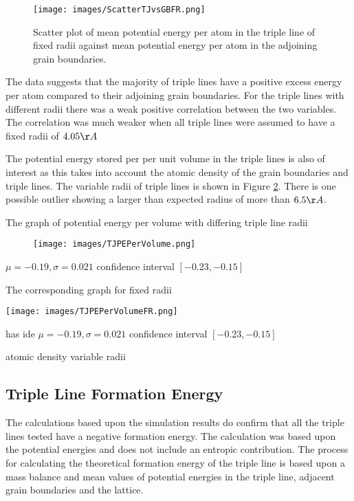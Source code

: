\documentclass[12pt,a4paper]{book}
\begin{document}
\begin{figure}
	\texttt{[image: images/ScatterTJvsGBFR.png]} 
	\label{fig:ScatterTJvsGBFR}
	\caption{Scatter plot of mean potential energy per atom in the triple line of fixed radii against mean potential energy per atom in the adjoining grain boundaries.}
\end{figure}

The data suggests that the majority of triple lines have a positive excess energy per atom compared to their adjoining grain boundaries. For the triple lines with different radii there was a weak positive correlation between the two variables. The correlation was much weaker when all triple lines were assumed to have a fixed radii of $4.05 \AA$ 

The potential energy stored per per unit volume in the triple lines is also of interest as this takes into account the atomic density of the grain boundaries and triple lines. The variable radii of triple lines is shown in Figure \ref{fig:PEPerVol}. There is one possible outlier showing a larger than expected radius of more than $6.5 \AA$. 




The graph of potential energy per volume with differing triple line radii

\begin{figure}
	\texttt{[image: images/TJPEPerVolume.png]} 
	\label{fig:PEPerVol}
\end{figure}
$\mu = -0.19, \sigma = 0.021$ confidence interval $[-0.23, -0.15]$

The corresponding graph for fixed radii

\texttt{[image: images/TJPEPerVolumeFR.png]} 

has ide
$\mu = -0.19, \sigma = 0.021$ confidence interval $[-0.23, -0.15]$

atomic density variable radii


\subsection{Triple Line Formation Energy}

The calculations based upon the simulation results do confirm that all the triple lines tested have a negative formation energy. The calculation was based upon the potential energies and does not include an entropic contribution. The process for calculating the theoretical formation energy of the triple line is based upon a mass balance and mean values of potential energies in the triple line, adjacent grain boundaries and the lattice.
\end{document}
